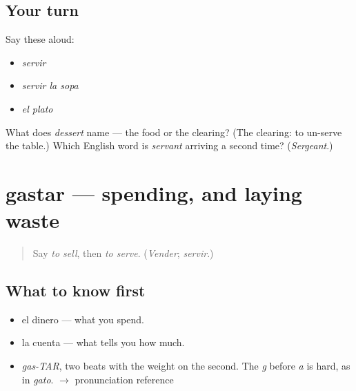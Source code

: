 \subsection*{Your turn}
Say these aloud:

\begin{itemize}
\raggedright
  \item \emph{servir}
  \item \emph{servir la sopa}
  \item \emph{el plato}
\end{itemize}

\begin{tcolorbox}[breakable,colback=teal!4,colframe=teal!35!black,title={Before you move on}]
What does \emph{dessert} name — the food or the clearing? (The clearing: to un-serve the table.) Which English word is \emph{servant} arriving a second time? (\emph{Sergeant}.)
\end{tcolorbox}
\section[gastar]{gastar — spending, and laying waste}

\label{lesson:ES-C386-gastar}



\begin{quote}
Say \emph{to sell}, then \emph{to serve}. (\emph{Vender}; \emph{servir}.)
\end{quote}

\subsection*{What to know first}
\begin{itemize}
\raggedright
  \item el dinero — what you spend.
  \item la cuenta — what tells you how much.
\end{itemize}

\begin{sounds}
\begin{itemize}
\raggedright
  \item \emph{gas-TAR}, two beats with the weight on the second. The \emph{g} before \emph{a} is hard, as in \emph{gato}. $\to$ pronunciation reference
\end{itemize}
\end{sounds}

